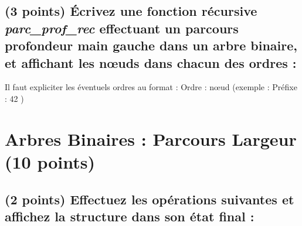 \documentclass[11pt,a4paper]{article}
\begin{document}

\subsection{(3 points) \'Ecrivez une fonction récursive \og \textit{parc\_prof\_rec} \fg{} effectuant un parcours profondeur main gauche dans un arbre binaire, et affichant les nœuds dans chacun des ordres : }

\noindent Il faut expliciter les éventuels ordres au format : \og Ordre : nœud \fg{} (exemple : \og Préfixe : 42 \fg{})

\begin{center}
\end{center}



\clearpage




\section{Arbres Binaires : Parcours Largeur (10 points)}




\subsection{(2 points) Effectuez les opérations suivantes et affichez la structure dans son état final : }
\end{document}
